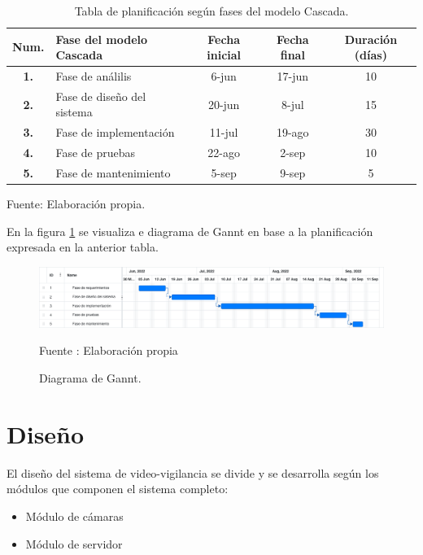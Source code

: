 \begin{table}[H]
    \caption{Tabla de planificación según fases del modelo Cascada.}
    \label{tabla:planning}
    \begin{center}
        \begin{tabular}{|c|l|c|c|c|}
            \hline
            \textbf{Num.} & \textbf{Fase del modelo Cascada}  &  \textbf{Fecha inicial} & \textbf{Fecha final} & \textbf{Duración (días)}\\ \hline
            \textbf{1.} & Fase de análilis        & 6-jun        & 17-jun        & 10        \\ \hline
            \textbf{2.} & Fase de diseño del sistema       & 20-jun        & 8-jul        & 15        \\ \hline
            \textbf{3.} & Fase de implementación        & 11-jul        & 19-ago        & 30        \\ \hline
            \textbf{4.} & Fase de pruebas        & 22-ago         &   2-sep     &    10     \\ \hline
            \textbf{5.} & Fase de mantenimiento        & 5-sep        & 9-sep        & 5        \\ \hline
        \end{tabular}
        \begin{center}            
            Fuente: Elaboración propia.
        \end{center}
    \end{center}
\end{table}

En la figura \ref{fig:gannt} se visualiza e diagrama de Gannt en base a la planificación expresada en la anterior tabla.
\begin{figure}[H]
    \begin{center}
        \includegraphics[width=17cm]{img/capitulo_4/gant.png}
    \end{center}
    \begin{center}
        \caption{Diagrama de Gannt.}
        Fuente : Elaboración propia
        \label{fig:gannt}
    \end{center}
\end{figure}

\section{Diseño}
El diseño del sistema de video-vigilancia se divide y se desarrolla según los módulos que componen el sistema completo:
\begin{itemize}
    \item Módulo de cámaras
    \item Módulo de servidor
\end{itemize}

